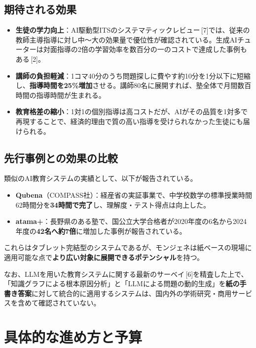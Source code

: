 \documentclass[paper=a4,fontsize=10.5bp,jafontsize=10.5bp,twocolumn]{jlreq}
\begin{document}
\subsection{期待される効果}

\begin{itemize}
  \item \textbf{生徒の学力向上}：AI駆動型ITSのシステマティックレビュー\,[7]では、従来の教師主導指導に対し中〜大の効果量で優位性が確認されている。生成AIチューターは対面指導の2倍の学習効率を数百分の一のコストで達成した事例もある\,[2]。
  \item \textbf{講師の負担軽減}：1コマ40分のうち問題探しに費やす約10分を1分以下に短縮し、\textbf{指導時間を25\%増加}させる。講師80名に展開すれば、塾全体で月間数百時間の指導時間が生まれる。
  \item \textbf{教育格差の縮小}：1対1の個別指導は高コストだが、AIがその品質を1対多で再現することで、経済的理由で質の高い指導を受けられなかった生徒にも届けられる。
\end{itemize}

\subsection{先行事例との効果の比較}

類似のAI教育システムの実績として、以下が報告されている。
\begin{itemize}
  \item \textbf{Qubena}（COMPASS社）：経産省の実証事業で、中学校数学の標準授業時間62時間分を\textbf{34時間で完了}し、理解度・テスト得点は向上した。
  \item \textbf{atama+}：長野県のある塾で、国公立大学合格者が2020年度の6名から2024年度の\textbf{42名へ約7倍}に増加した事例が報告されている。
\end{itemize}

これらはタブレット完結型のシステムであるが、モンジェネは紙ベースの現場に適用可能な点で\textbf{より広い対象に展開できるポテンシャル}を持つ。

なお、LLMを用いた教育システムに関する最新のサーベイ\,[6]を精査した上で、「知識グラフによる根本原因分析」と「LLMによる問題の動的生成」を\textbf{紙の手書き答案}に対して統合的に適用するシステムは、国内外の学術研究・商用サービスを含めて確認されていない。

\section{具体的な進め方と予算}
\end{document}
